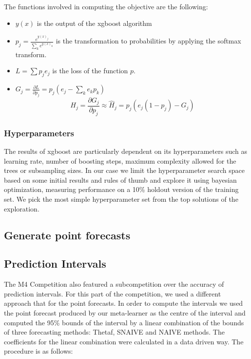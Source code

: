\documentclass[11pt,a4paper,]{article}
\providecommand{\tightlist}{%
  \setlength{\itemsep}{0pt}\setlength{\parskip}{0pt}}
\theoremstyle{definition}
\theoremstyle{definition}
\theoremstyle{definition}
\theoremstyle{remark}
\begin{document}
The functions involved in computing the objective are the following:

\begin{itemize}
\tightlist
\item
  \(y(x)\) is the output of the xgboost algorithm
\item
  \(p_j = \frac{e^{y(x)_j}}{ \sum_k e^{y(x)_k}}\) is the transformation
  to probabilities by applying the softmax transform.
\item
  \(L = \sum p_j e_j\) is the loss of the function \(p\).
\item
  \(G_j = \frac{\partial{L}}{\partial{p_j}} = p_j(e_j -\sum_k e_kp_k)\)
  \[ H_j = \frac{\partial{G_j}}{\partial{p_j}} \approx \hat{H}_j = p_j(e_j(1-p_j) - G_j)  \]
\end{itemize}

\subsubsection{Hyperparameters}\label{hyperparameters}

The results of xgboost are particularly dependent on its hyperparameters
such as learning rate, number of boosting steps, maximum complexity
allowed for the trees or subsampling sizes. In our case we limit the
hyperparameter search space based on some initial results and rules of
thumb and explore it using bayesian optimization, measuring performance
on a 10\% holdout version of the training set. We pick the most simple
hyperparameter set from the top solutions of the exploration.

\subsection{Generate point forecasts}\label{generate-point-forecasts}

\subsection{Prediction Intervals}\label{prediction-intervals}

The M4 Competition also featured a subcompetition over the accuracy of
prediction intervals. For this part of the competition, we used a
different approach that for the point forecasts. In order to compute the
intervals we used the point forecast produced by our meta-learner as the
centre of the interval and computed the 95\% bounds of the interval by a
linear combination of the bounds of three forecasting methods: Thetaf,
SNAIVE and NAIVE methods. The coefficients for the linear combination
were calculated in a data driven way. The procedure is as follows:
\end{document}
